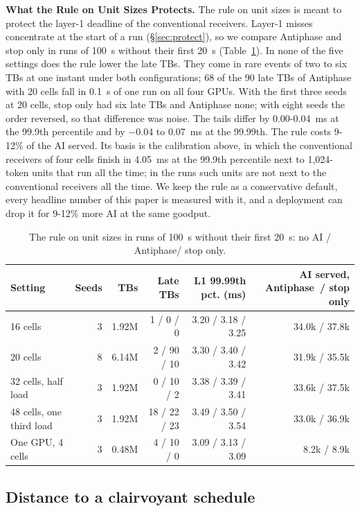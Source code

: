 \documentclass[acmsmall,screen,review,anonymous]{acmart}
\newcommand{\sys}{Antiphase\xspace}
\begin{document}
\noindent\textbf{What the Rule on Unit Sizes Protects.} The rule on unit sizes is meant to protect the
layer-1 deadline of the conventional receivers. Layer-1 misses concentrate at the start of a run
(\S\ref{sec:protect}), so we compare \sys and stop only in runs of 100~s without their first 20~s
(Table~\ref{tab:unitrule}). In none of the five settings does the rule lower the late TBs. They come in
rare events of two to six TBs at one instant under both configurations; 68 of the 90 late TBs of \sys with
20 cells fall in 0.1~s of one run on all four GPUs. With the first three seeds at 20 cells, stop only had
six late TBs and \sys none; with eight seeds the order reversed, so that difference was noise. The tails
differ by 0.00-0.04~ms at the 99.9th percentile and by $-$0.04 to 0.07~ms at the 99.99th. The rule costs
9-12\% of the AI served. Its basis is the calibration above, in which the conventional receivers of four
cells finish in 4.05~ms at the 99.9th percentile next to 1,024-token units that run all the time; in the runs
such units are not next to the conventional receivers all the time. We keep the rule as a conservative
default, every headline number of this paper is measured with it, and a deployment can drop it for 9-12\%
more AI at the same goodput.

\begin{table}[t]
\caption{The rule on unit sizes in runs of 100~s without their first 20~s: no AI / \sys / stop only.}
\label{tab:unitrule}
\footnotesize
\setlength{\tabcolsep}{4pt}
\begin{tabular}{@{}lrrrrr@{}}
\toprule
Setting & Seeds & TBs & Late TBs & L1 99.99th pct. (ms) & AI served, \sys\ / stop only \\
\midrule
16 cells & 3 & 1.92M & 1 / 0 / 0 & 3.20 / 3.18 / 3.25 & 34.0k / 37.8k \\
20 cells & 8 & 6.14M & 2 / 90 / 10 & 3.30 / 3.40 / 3.42 & 31.9k / 35.5k \\
32 cells, half load & 3 & 1.92M & 0 / 10 / 2 & 3.38 / 3.39 / 3.41 & 33.6k / 37.5k \\
48 cells, one third load & 3 & 1.92M & 18 / 22 / 23 & 3.49 / 3.50 / 3.54 & 33.0k / 36.9k \\
One GPU, 4 cells & 3 & 0.48M & 4 / 10 / 0 & 3.09 / 3.13 / 3.09 & 8.2k / 8.9k \\
\bottomrule
\end{tabular}
\end{table}

\subsection{Distance to a clairvoyant schedule}
\label{sec:clairvoyant}
\end{document}
